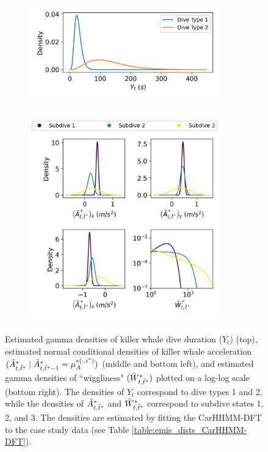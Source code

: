 \begin{figure}[ht]
    \begin{subfigure}{\textwidth}
    	\centering
    	\includegraphics[width=3.25in]{../Plots/2019/20190902-182840-CATs_OB_1_0_267_CarHHMM2-coarse-emissions.png}
    \end{subfigure}
    \newline
    \begin{subfigure}{\textwidth}
    	\centering
    	\includegraphics[width=3.25in]{../Plots/2019/20190902-182840-CATs_OB_1_0_267_CarHHMM2-fine-emissions.png}
    \end{subfigure}
    \caption{Estimated gamma densities of killer whale dive duration ($Y_t$) (top), estimated normal conditional densities of killer whale acceleration $(\tilde{A}^*_{t,\tilde t^*} \mid \tilde{A}^*_{t,\tilde t^*-1} = \mu_A^{*(\cdot,i^*)})$ (middle and bottom left), and estimated gamma densities of ``wiggliness" $(\tilde{W}^*_{t,\tilde t^*})$ plotted on a log-log scale (bottom right). The densities of $Y_t$ correspond to dive types 1 and 2, while the densities of $\tilde{A}^*_{t,\tilde t^*}$ and $\tilde{W}^*_{t,\tilde t^*}$ correspond to subdive states 1, 2, and 3. The densities are estimated by fitting the CarHHMM-DFT to the case study data (see Table \ref{table:emis_dists_CarHHMM-DFT}).}
    \label{fig:emis}
\end{figure}

